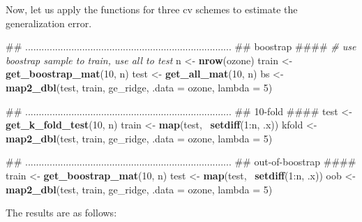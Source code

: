 \documentclass[]{book}
\newenvironment{Shaded}{\begin{snugshade}}{\end{snugshade}}
\newcommand{\KeywordTok}[1]{\textcolor[rgb]{0.13,0.29,0.53}{\textbf{{#1}}}}
\newcommand{\DataTypeTok}[1]{\textcolor[rgb]{0.13,0.29,0.53}{{#1}}}
\newcommand{\DecValTok}[1]{\textcolor[rgb]{0.00,0.00,0.81}{{#1}}}
\newcommand{\StringTok}[1]{\textcolor[rgb]{0.31,0.60,0.02}{{#1}}}
\newcommand{\CommentTok}[1]{\textcolor[rgb]{0.56,0.35,0.01}{\textit{{#1}}}}
\newcommand{\NormalTok}[1]{{#1}}
\begin{document}
Now, let us apply the functions for three cv schemes to estimate the
generalization error.

\begin{Shaded}
\begin{Highlighting}[]
\NormalTok{##  ............................................................................}
\NormalTok{##  boostrap                                                                ####}
\CommentTok{# use boostrap sample to train, use all to test}
\NormalTok{n <-}\StringTok{ }\KeywordTok{nrow}\NormalTok{(ozone)}
\NormalTok{train <-}\StringTok{ }\KeywordTok{get_boostrap_mat}\NormalTok{(}\DecValTok{10}\NormalTok{, n)}
\NormalTok{test <-}\StringTok{ }\KeywordTok{get_all_mat}\NormalTok{(}\DecValTok{10}\NormalTok{, n)}
\NormalTok{bs <-}\StringTok{ }\KeywordTok{map2_dbl}\NormalTok{(test, train, ge_ridge, }\DataTypeTok{.data =} \NormalTok{ozone, }\DataTypeTok{lambda =} \DecValTok{5}\NormalTok{)}



\NormalTok{##  ............................................................................}
\NormalTok{##  10-fold                                                                 ####}
\NormalTok{test <-}\StringTok{ }\KeywordTok{get_k_fold_test}\NormalTok{(}\DecValTok{10}\NormalTok{, n)}
\NormalTok{train <-}\StringTok{ }\KeywordTok{map}\NormalTok{(test, ~}\KeywordTok{setdiff}\NormalTok{(}\DecValTok{1}\NormalTok{:n, .x))}
\NormalTok{kfold <-}\StringTok{ }\KeywordTok{map2_dbl}\NormalTok{(test, train, ge_ridge, }\DataTypeTok{.data =} \NormalTok{ozone, }\DataTypeTok{lambda =} \DecValTok{5}\NormalTok{)}

\NormalTok{##  ............................................................................}
\NormalTok{##  out-of-boostrap                                                         ####}
\NormalTok{train <-}\StringTok{ }\KeywordTok{get_boostrap_mat}\NormalTok{(}\DecValTok{10}\NormalTok{, n)}
\NormalTok{test <-}\StringTok{ }\KeywordTok{map}\NormalTok{(test, ~}\KeywordTok{setdiff}\NormalTok{(}\DecValTok{1}\NormalTok{:n, .x))}
\NormalTok{oob <-}\StringTok{ }\KeywordTok{map2_dbl}\NormalTok{(test, train, ge_ridge, }\DataTypeTok{.data =} \NormalTok{ozone, }\DataTypeTok{lambda =} \DecValTok{5}\NormalTok{)}
\end{Highlighting}
\end{Shaded}

The results are as follows:

\begin{Shaded}
\end{Shaded}
\end{document}
